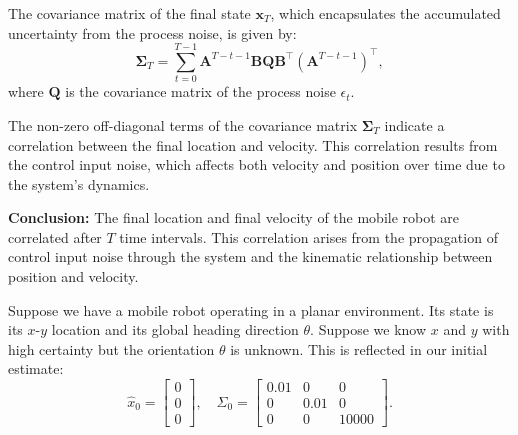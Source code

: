 \documentclass[answers]{exam}
\begin{document}
\begin{questions}
\begin{parts}
\begin{solution}
            The covariance matrix of the final state \( \mathbf{x}_T \), which encapsulates the accumulated uncertainty from the process noise, is given by:
            \begin{equation}
                \mathbf{\Sigma}_T = \sum_{t=0}^{T-1} \mathbf{A}^{T-t-1} \mathbf{B} \mathbf{Q} \mathbf{B}^\top (\mathbf{A}^{T-t-1})^\top,
            \end{equation}
            where \( \mathbf{Q} \) is the covariance matrix of the process noise \( \epsilon_t \).
            
            The non-zero off-diagonal terms of the covariance matrix \( \mathbf{\Sigma}_T \) indicate a correlation between the final location and velocity. This correlation results from the control input noise, which affects both velocity and position over time due to the system's dynamics.
            
            \textbf{Conclusion:} The final location and final velocity of the mobile robot are correlated after \( T \) time intervals. This correlation arises from the propagation of control input noise through the system and the kinematic relationship between position and velocity.
        \end{solution}            
    \end{parts}

    \question[20]
    Suppose we have a mobile robot operating in a planar environment. Its state is its \(x\)-\(y\) location and its global heading direction \(\theta\). Suppose we know \(x\) and \(y\) with high certainty but the orientation \(\theta\) is unknown. This is reflected in our initial estimate:
    \[
    \hat{x}_0 = \begin{bmatrix} 0 \\ 0 \\ 0 \end{bmatrix}, \quad
    \Sigma_0 = \begin{bmatrix} 0.01 & 0 & 0 \\ 0 & 0.01 & 0 \\ 0 & 0 & 10000 \end{bmatrix}.
    \]
\end{questions}
\end{document}
